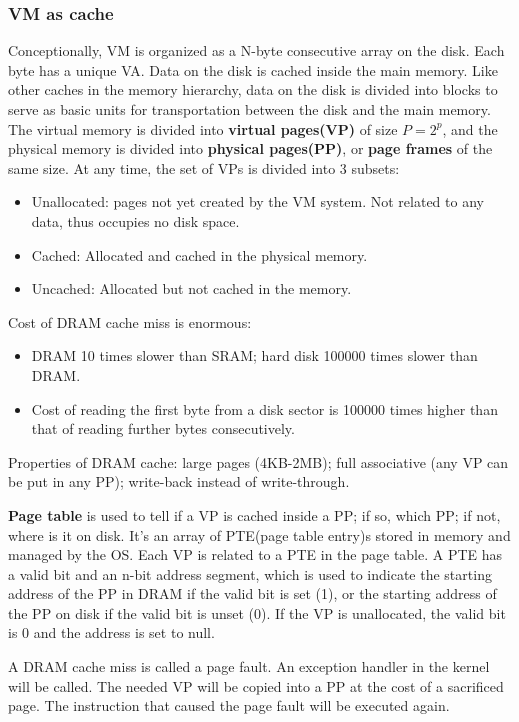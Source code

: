 \subsubsection{VM as cache}
Conceptionally, VM is organized as a N-byte consecutive array on the disk. Each byte has a unique VA. Data on the disk is cached inside the main memory. Like other caches in the memory hierarchy, data on the disk is divided into blocks to serve as basic units for transportation between the disk and the main memory. The virtual memory is divided into \textbf{virtual pages(VP)} of size $P=2^p$, and the physical memory is divided into \textbf{physical pages(PP)}, or \textbf{page frames} of the same size. At any time, the set of VPs is divided into 3 subsets: 
\begin{itemize}
	\item Unallocated: pages not yet created by the VM system. Not related to any data, thus occupies no disk space.
	\item Cached: Allocated and cached in the physical memory.
	\item Uncached: Allocated but not cached in the memory.
\end{itemize}
Cost of DRAM cache miss is enormous:
\begin{itemize}
	\item DRAM 10 times slower than SRAM; hard disk 100000 times slower than DRAM.
	\item Cost of reading the first byte from a disk sector is 100000 times higher than that of reading further bytes consecutively.
\end{itemize}
Properties of DRAM cache: large pages (4KB-2MB); full associative (any VP can be put in any PP); write-back instead of write-through.

\textbf{Page table} is used to tell if a VP is cached inside a PP; if so, which PP; if not, where is it on disk. It's an array of PTE(page table entry)s stored in memory and managed by the OS. Each VP is related to a PTE in the page table. A PTE has a valid bit and an n-bit address segment, which is used to indicate the starting address of the PP in DRAM if the valid bit is set (1), or the starting address of the PP on disk if the valid bit is unset (0). If the VP is unallocated, the valid bit is 0 and the address is set to null. 

A DRAM cache miss is called a page fault. An exception handler in the kernel will be called. The needed VP will be copied into a PP at the cost of a sacrificed page. The instruction that caused the page fault will be executed again.

